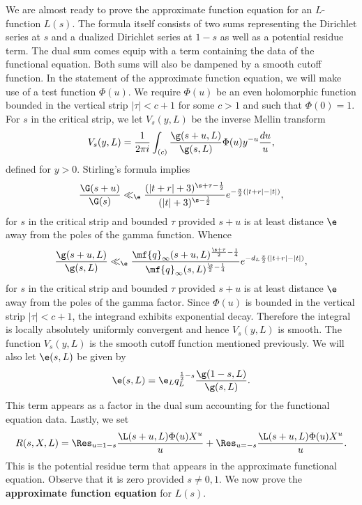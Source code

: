 \documentclass[12pt]{article}
\begin{document}
      We are almost ready to prove the approximate function equation for an \(L\)-function \(L(s)\). The formula itself consists of two sums representing the Dirichlet series at \(s\) and a dualized Dirichlet series at \(1-s\) as well as a potential residue term. The dual sum comes equip with a term containing the data of the functional equation. Both sums will also be dampened by a smooth cutoff function. In the statement of the approximate function equation, we will make use of a test function \(\Phi(u)\). We require \(\Phi(u)\) be an even holomorphic function bounded in the vertical strip \(|\tau| < c+1\) for some \(c > 1\) and such that \(\Phi(0) = 1\). For \(s\) in the critical strip, we let \(V_{s}(y,L)\) be the inverse Mellin transform
      \[
        V_{s}(y,L) = \frac{1}{2\pi i}\int_{(c)}\frac{\g(s+u,L)}{\g(s,L)}\Phi(u)y^{-u}\frac{du}{u},
      \]
      defined for \(y > 0\). Stirling's formula implies
      \[
        \frac{\G(s+u)}{\G(s)} \ll_{\e} \frac{(|t+r|+3)^{\s+\tau-\frac{1}{2}}}{(|t|+3)^{\s-\frac{1}{2}}}e^{-\frac{\pi}{2}(|t+r|-|t|)},
      \]
      for \(s\) in the critical strip and bounded \(\tau\) provided \(s+u\) is at least distance \(\e\) away from the poles of the gamma function. Whence
      \begin{equation}\label{equ:gamma_factor_s_and_u_estimate}
        \frac{\g(s+u,L)}{\g(s,L)} \ll_{\e} \frac{\mf{q}_{\infty}(s+u,L)^{\frac{\s+\tau}{2}-\frac{1}{4}}}{\mf{q}_{\infty}(s,L)^{\frac{\s}{2}-\frac{1}{4}}}e^{-d_{L}\frac{\pi}{2}(|t+r|-|t|)},
      \end{equation}
      for \(s\) in the critical strip and bounded \(\tau\) provided \(s+u\) is at least distance \(\e\) away from the poles of the gamma factor. Since \(\Phi(u)\) is bounded in the vertical strip \(|\tau| < c+1\), the integrand exhibits exponential decay. Therefore the integral is locally absolutely uniformly convergent and hence \(V_{s}(y,L)\) is smooth. The function \(V_{s}(y,L)\) is the smooth cutoff function mentioned previously. We will also let \(\e(s,L)\) be given by
      \[
        \e(s,L) = \e_{L}q_{L}^{\frac{1}{2}-s}\frac{\g(1-s,L)}{\g(s,L)}.
      \]
      This term appears as a factor in the dual sum accounting for the functional equation data. Lastly, we set
      \[
        R(s,X,L) = \Res_{u = 1-s}\frac{\L(s+u,L)\Phi(u)X^{u}}{u}+\Res_{u = -s}\frac{\L(s+u,L)\Phi(u)X^{u}}{u}.
      \]
      This is the potential residue term that appears in the approximate functional equation. Observe that it is zero provided \(s \neq 0,1\). We now prove the \textbf{approximate function equation} for \(L(s)\).
\end{document}
